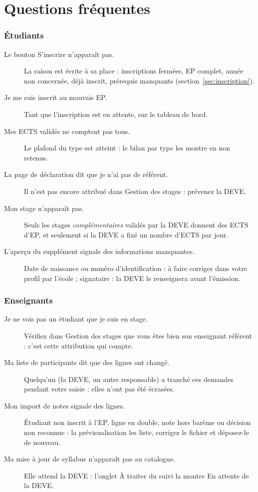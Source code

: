 \documentclass[11pt,a4paper]{article}
\begin{document}
\newpage
\part{Questions fréquentes}\label{part:faq}

\section{Étudiants}

\begin{description}
  \item[Le bouton \og S'inscrire\fg{} n'apparaît pas.] La raison est écrite à sa place :
    inscriptions fermées, EP complet, année non concernée, déjà inscrit, prérequis manquants
    (section~\ref{sec:inscription}).
  \item[Je me suis inscrit au mauvais EP.] Tant que l'inscription est en attente,
     sur le tableau de bord.
  \item[Mes ECTS validés ne comptent pas tous.] Le plafond du type est atteint : le bilan par
    type les montre en \og non retenus\fg{}.
  \item[La page de déclaration dit que je n'ai pas de référent.] Il n'est pas encore attribué
    dans \og Gestion des stages\fg{} : prévenez la DEVE.
  \item[Mon stage n'apparaît pas.] Seuls les stages \emph{complémentaires} validés par la DEVE
    donnent des ECTS d'EP, et seulement si la DEVE a fixé un nombre d'ECTS par jour.
  \item[L'aperçu du supplément signale des informations manquantes.] Date de naissance ou
    numéro d'identification : à faire corriger dans votre profil par l'école ; signataire : la
    DEVE le renseignera avant l'émission.
\end{description}

\section{Enseignants}

\begin{description}
  \item[Je ne vois pas un étudiant que je suis en stage.] Vérifiez dans \og Gestion des
    stages\fg{} que vous êtes bien son enseignant référent : c'est cette attribution qui compte.
  \item[Ma liste de participants dit que des lignes ont changé.] Quelqu'un (la DEVE, un autre
    responsable) a tranché ces demandes pendant votre saisie : elles n'ont pas été écrasées.
  \item[Mon import de notes signale des lignes.] Étudiant non inscrit à l'EP, ligne en double,
    note hors barème ou décision non reconnue : la prévisualisation les liste, corrigez le
    fichier et déposez-le de nouveau.
  \item[Ma mise à jour de syllabus n'apparaît pas au catalogue.] Elle attend la DEVE : l'onglet
    \og À traiter\fg{} du suivi la montre \og En attente de la DEVE\fg{}.
\end{description}
\end{document}
